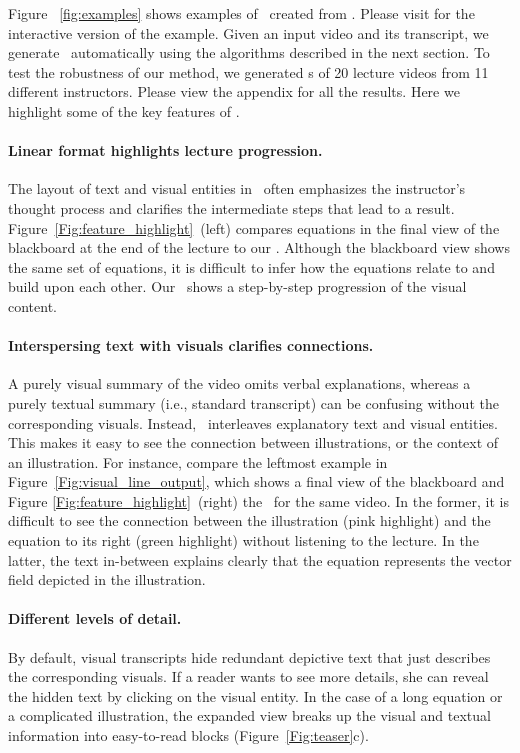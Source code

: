 Figure ~\ref{fig:examples} shows examples of \systemname\ created from . Please visit  for the interactive version of the example. Given an input video and its transcript, we generate \systemname\ automatically using the algorithms described in the next section. To test the robustness of our method, we generated \systemname s of 20 lecture videos from 11 different instructors. Please view the appendix for all the results. Here we highlight some of the key features of \systemname .\\
%
\paragraph{Linear format highlights lecture progression.} The layout of text and visual entities in \systemname\ often emphasizes the instructor's thought process and clarifies the intermediate steps that lead to a result. Figure~\ref{Fig:feature_highlight}~(left) compares equations in the final view of the blackboard at the end of the lecture to our \systemname . Although the blackboard view shows the same set of equations, it is difficult to infer how the equations relate to and build upon each other. Our \systemname\ shows a step-by-step progression of the visual content. 
%
\paragraph{Interspersing text with visuals clarifies connections.} A purely visual summary of the video omits verbal explanations, whereas a purely textual summary (i.e., standard transcript) can be confusing without the corresponding visuals. Instead, \systemname\ interleaves explanatory text and visual entities. This makes it easy to see the connection between illustrations, or the context of an illustration. For instance, compare the leftmost example in Figure~\ref{Fig:visual_line_output}, which shows a final view of the blackboard and Figure \ref{Fig:feature_highlight}~(right) the \systemname\ for the same video. In the former, it is difficult to see the connection between the illustration (pink highlight) and the equation to its right (green highlight) without listening to the lecture. In the latter, the text in-between explains clearly that the equation represents the vector field depicted in the illustration.
%
\paragraph{Different levels of detail.} By default, visual transcripts hide redundant depictive text that just describes the corresponding visuals. If a reader wants to see more details, she can reveal the hidden text by clicking on the visual entity. In the case of a long equation or a complicated illustration, the expanded view breaks up the visual and textual information 
into easy-to-read blocks (Figure~\ref{Fig:teaser}c). 

